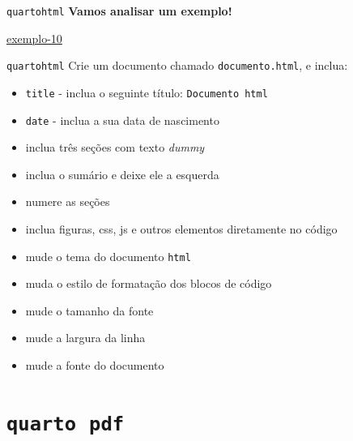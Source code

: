 \documentclass[
  10pt,
  ignorenonframetext,
]{beamer}
\providecommand{\tightlist}{%
  \setlength{\itemsep}{0pt}\setlength{\parskip}{0pt}}\usepackage{longtable,booktabs,array}
\begin{document}
\begin{frame}{\texttt{quarto}\newline \texttt{html}}
\protect\hypertarget{quartohtml-2}{}
\textbf{Vamos analisar um exemplo!}

\href{https://ufbabr-my.sharepoint.com/:f:/g/personal/gilberto_sassi_ufba_br/Em1mAhSxjuBDoykKBRJWHvQBjvcwfKylceSuBv-P7le9aQ?e=exHf9T}{exemplo-10}
\end{frame}

\begin{frame}[fragile]{\texttt{quarto}\newline \texttt{html}}
\protect\hypertarget{quartohtml-3}{}
Crie um documento chamado \texttt{documento.html}, e inclua:

\begin{itemize}
\tightlist
\item
  \texttt{title} - inclua o seguinte título: \texttt{Documento\ html}
\item
  \texttt{date} - inclua a sua data de nascimento
\item
  inclua três seções com texto \emph{dummy}
\item
  inclua o sumário e deixe ele a esquerda
\item
  numere as seções
\item
  inclua figuras, css, js e outros elementos diretamente no código
\item
  mude o tema do documento \texttt{html}
\item
  muda o estilo de formatação dos blocos de código
\item
  mude o tamanho da fonte
\item
  mude a largura da linha
\item
  mude a fonte do documento
\end{itemize}
\end{frame}

\hypertarget{quarto-pdf}{%
\section{\texorpdfstring{\texttt{quarto}\newline\newline~\texttt{pdf}}{quarto~pdf}}\label{quarto-pdf}}
\end{document}
